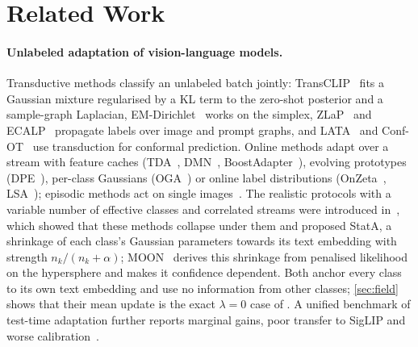 \section{Related Work}
\label{sec:related}

\paragraph{Unlabeled adaptation of vision-language models.}
Transductive methods classify an unlabeled batch jointly: TransCLIP~\cite{zanella2024transclip} fits a Gaussian mixture regularised by a KL term to the zero-shot posterior and a sample-graph Laplacian, EM-Dirichlet~\cite{martin2024transductive} works on the simplex, ZLaP~\cite{kalantidis2024zlap} and ECALP~\cite{li2025ecalp} propagate labels over image and prompt graphs, and LATA~\cite{bozorgtabar2026lata} and Conf-OT~\cite{silva2025confot} use transduction for conformal prediction. Online methods adapt over a stream with feature caches (TDA~\cite{karmanov2024tda}, DMN~\cite{zhang2024dmn}, BoostAdapter~\cite{zhang2024boostadapter}), evolving prototypes (DPE~\cite{zhang2024dpe}), per-class Gaussians (OGA~\cite{fuchs2025oga}) or online label distributions (OnZeta~\cite{qian2024onzeta}, LSA~\cite{han2026lsa}); episodic methods act on single images~\cite{shu2022tpt,zanella2024mta,farina2024zero,sui2025tps}. The realistic protocols with a variable number of effective classes and correlated streams were introduced in~\cite{zanella2025stata}, which showed that these methods collapse under them and proposed StatA, a shrinkage of each class's Gaussian parameters towards its text embedding with strength $n_k/(n_k+\alpha)$; MOON~\cite{huang2026moon} derives this shrinkage from penalised likelihood on the hypersphere and makes it confidence dependent. Both anchor every class to its own text embedding and use no information from other classes; \cref{sec:field} shows that their mean update is the exact $\lambda=0$ case of \method. A unified benchmark of test-time adaptation further reports marginal gains, poor transfer to SigLIP and worse calibration~\cite{sheng2025illusion}.

